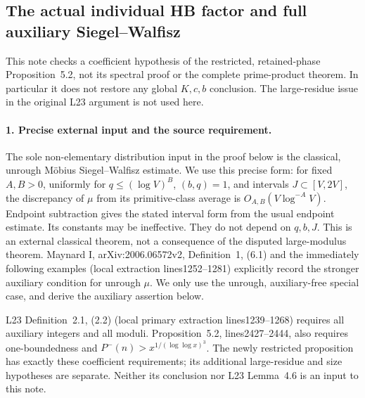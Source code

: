 \subsection{The actual individual HB factor and full auxiliary Siegel--Walfisz}
\label{sec:hb-rough-sw-insertion-20261009}

This note checks a coefficient hypothesis of the restricted, retained-phase
Proposition~5.2, not its spectral proof or the complete prime-product
theorem. In particular it does not restore any global $K,c,b$ conclusion.
The large-residue issue in the original L23 argument is not used here.

\paragraph{1. Precise external input and the source requirement.}
The sole non-elementary distribution input in the proof below is the
classical, unrough M\"obius Siegel--Walfisz estimate. We use this precise
form: for fixed $A,B>0$, uniformly for $q\le(\log V)^B$, $(b,q)=1$,
and intervals $J\subset[V,2V]$, the discrepancy of $\mu$ from its
primitive-class average is $O_{A,B}(V\log^{-A}V)$. Endpoint subtraction
gives the stated interval form from the usual endpoint estimate.
Its constants may be ineffective. They do not depend on $q,b,J$.
This is an external classical theorem, not a consequence of the disputed
large-modulus theorem. Maynard I, arXiv:2006.06572v2, Definition~1,
(6.1) and the immediately following examples (local extraction
lines1252--1281) explicitly record the stronger auxiliary condition for
unrough $\mu$. We only use the unrough, auxiliary-free special case,
and derive the auxiliary assertion below.

L23 Definition~2.1, (2.2) (local primary extraction lines1239--1268)
requires all auxiliary integers and all moduli. Proposition~5.2,
lines2427--2444, also requires one-boundedness and
$P^-(n)>x^{1/(\log\log x)^3}$. The newly restricted proposition has
exactly these coefficient requirements; its additional large-residue
and size hypotheses are separate. Neither its conclusion nor L23
Lemma~4.6 is an input to this note.

